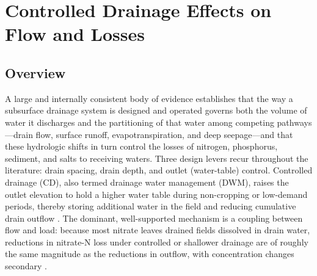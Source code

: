 \documentclass[11pt]{article}
\begin{document}
\section*{Controlled Drainage Effects on Flow and Losses}

\subsection{Overview}

A large and internally consistent body of evidence establishes that the way a
subsurface drainage system is designed and operated governs both the volume of
water it discharges and the partitioning of that water among competing
pathways---drain flow, surface runoff, evapotranspiration, and deep
seepage---and that these hydrologic shifts in turn control the losses of
nitrogen, phosphorus, sediment, and salts to receiving waters. Three design
levers recur throughout the literature: drain spacing, drain depth, and outlet
(water-table) control. Controlled drainage (CD), also termed drainage water
management (DWM), raises the outlet elevation to hold a higher water table
during non-cropping or low-demand periods, thereby storing additional water in
the field and reducing cumulative drain outflow \parencite{Singh2020,Strock2011,Blann2009}.
The dominant, well-supported mechanism is a coupling between flow and load:
because most nitrate leaves drained fields dissolved in drain water, reductions
in nitrate-N loss under controlled or shallower drainage are of roughly the same
magnitude as the reductions in outflow, with concentration changes secondary
\parencite{Wesström2007,Frankenberger2024,Lalonde1996,Tolomio2018}.
\end{document}

